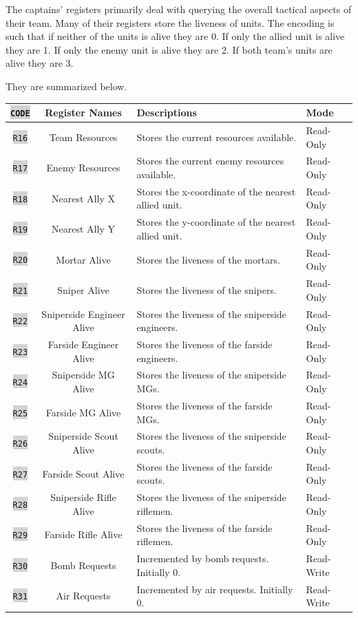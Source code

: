 \documentclass{article}
\newcommand{\vnscode}[1]{\colorbox{lightgray}{\lstinline[language=vns]{#1}}}
\begin{document}
The captains' registers primarily deal with querying the overall tactical
aspects of their team. Many of their registers store the liveness of units. The
encoding is such that if neither of the units is alive they are 0. If only the
allied unit is alive they are 1. If only the enemy unit is alive they are 2. If
both team's units are alive they are 3.

They are summarized below.

\begin{minipage}{\textwidth}
\centering
\begin{tabular}{|c|c|l|l|}
    \hline \vnscode{CODE} & Register Names & Descriptions & Mode \\ \hline
    \vnscode{R16} & Team Resources & Stores the current resources available. & Read-Only \\ \hline
    \vnscode{R17} & Enemy Resources & Stores the current enemy resources available. & Read-Only \\ \hline
    \vnscode{R18} & Nearest Ally X & Stores the x-coordinate of the nearest allied unit. & Read-Only \\ \hline
    \vnscode{R19} & Nearest Ally Y & Stores the y-coordinate of the nearest allied unit. & Read-Only \\ \hline
    \vnscode{R20} & Mortar Alive & Stores the liveness of the mortars. & Read-Only \\ \hline
    \vnscode{R21} & Sniper Alive & Stores the liveness of the snipers. & Read-Only \\ \hline
    \vnscode{R22} & Sniperside Engineer Alive & Stores the liveness of the sniperside engineers. & Read-Only \\ \hline
    \vnscode{R23} & Farside Engineer Alive & Stores the liveness of the farside engineers. & Read-Only \\ \hline
    \vnscode{R24} & Sniperside MG Alive & Stores the liveness of the sniperside MGs. & Read-Only \\ \hline
    \vnscode{R25} & Farside MG Alive & Stores the liveness of the farside MGs. & Read-Only \\ \hline
    \vnscode{R26} & Sniperside Scout Alive & Stores the liveness of the sniperside scouts. & Read-Only \\ \hline
    \vnscode{R27} & Farside Scout Alive & Stores the liveness of the farside scouts. & Read-Only \\ \hline
    \vnscode{R28} & Sniperside Rifle Alive & Stores the liveness of the sniperside riflemen. & Read-Only \\ \hline
    \vnscode{R29} & Farside Rifle Alive & Stores the liveness of the farside riflemen. & Read-Only \\ \hline
    \vnscode{R30} & Bomb Requests & Incremented by bomb requests. Initially 0. & Read-Write \\ \hline
    \vnscode{R31} & Air Requests & Incremented by air requests. Initially 0. & Read-Write \\ \hline
\end{tabular}
\end{minipage}
\end{document}
